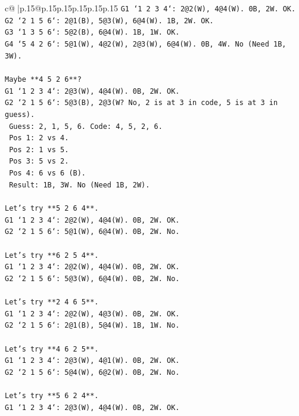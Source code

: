 \documentclass{article}
\begin{document}
{\begin{supertabular}{c@{$\;$}|p{.15\linewidth}@{}p{.15\linewidth}p{.15\linewidth}p{.15\linewidth}p{.15\linewidth}p{.15\linewidth}}
{{{\texttt{G1 `1 2 3 4`: 2@2(W), 4@4(W). 0B, 2W. OK.} \\
\texttt{G2 `2 1 5 6`: 2@1(B), 5@3(W), 6@4(W). 1B, 2W. OK.} \\
\texttt{G3 `1 3 5 6`: 5@2(B), 6@4(W). 1B, 1W. OK.} \\
\texttt{G4 `5 4 2 6`: 5@1(W), 4@2(W), 2@3(W), 6@4(W). 0B, 4W. No (Need 1B, 3W).} \\
\\ 
\texttt{Maybe **4 5 2 6**?} \\
\texttt{G1 `1 2 3 4`: 2@3(W), 4@4(W). 0B, 2W. OK.} \\
\texttt{G2 `2 1 5 6`: 5@3(B), 2@3(W? No, 2 is at 3 in code, 5 is at 3 in guess).} \\
\texttt{   Guess: 2, 1, 5, 6. Code: 4, 5, 2, 6.} \\
\texttt{   Pos 1: 2 vs 4.} \\
\texttt{   Pos 2: 1 vs 5.} \\
\texttt{   Pos 3: 5 vs 2.} \\
\texttt{   Pos 4: 6 vs 6 (B).} \\
\texttt{   Result: 1B, 3W. No (Need 1B, 2W).} \\
\\ 
\texttt{Let's try **5 2 6 4**.} \\
\texttt{G1 `1 2 3 4`: 2@2(W), 4@4(W). 0B, 2W. OK.} \\
\texttt{G2 `2 1 5 6`: 5@1(W), 6@4(W). 0B, 2W. No.} \\
\\ 
\texttt{Let's try **6 2 5 4**.} \\
\texttt{G1 `1 2 3 4`: 2@2(W), 4@4(W). 0B, 2W. OK.} \\
\texttt{G2 `2 1 5 6`: 5@3(W), 6@4(W). 0B, 2W. No.} \\
\\ 
\texttt{Let's try **2 4 6 5**.} \\
\texttt{G1 `1 2 3 4`: 2@2(W), 4@3(W). 0B, 2W. OK.} \\
\texttt{G2 `2 1 5 6`: 2@1(B), 5@4(W). 1B, 1W. No.} \\
\\ 
\texttt{Let's try **4 6 2 5**.} \\
\texttt{G1 `1 2 3 4`: 2@3(W), 4@1(W). 0B, 2W. OK.} \\
\texttt{G2 `2 1 5 6`: 5@4(W), 6@2(W). 0B, 2W. No.} \\
\\ 
\texttt{Let's try **5 6 2 4**.} \\
\texttt{G1 `1 2 3 4`: 2@3(W), 4@4(W). 0B, 2W. OK.} \\
}}}
\end{supertabular}}
\end{document}
